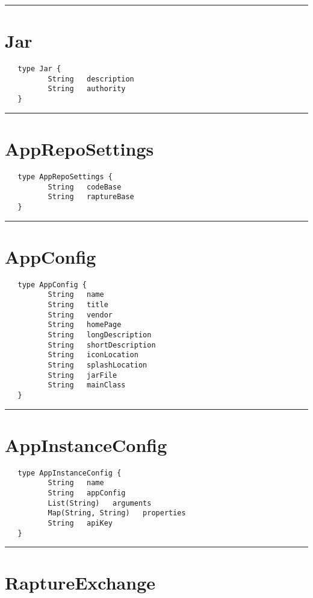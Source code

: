 \rule{12cm}{2pt}
\section{Jar}
\label{type:Jar}

\begin{Verbatim}
   type Jar {
          String   description
          String   authority
   }
\end{Verbatim}

\rule{12cm}{2pt}
\section{AppRepoSettings}
\label{type:AppRepoSettings}

\begin{Verbatim}
   type AppRepoSettings {
          String   codeBase
          String   raptureBase
   }
\end{Verbatim}

\rule{12cm}{2pt}
\section{AppConfig}
\label{type:AppConfig}

\begin{Verbatim}
   type AppConfig {
          String   name
          String   title
          String   vendor
          String   homePage
          String   longDescription
          String   shortDescription
          String   iconLocation
          String   splashLocation
          String   jarFile
          String   mainClass
   }
\end{Verbatim}

\rule{12cm}{2pt}
\section{AppInstanceConfig}
\label{type:AppInstanceConfig}

\begin{Verbatim}
   type AppInstanceConfig {
          String   name
          String   appConfig
          List(String)   arguments
          Map(String, String)   properties
          String   apiKey
   }
\end{Verbatim}

\rule{12cm}{2pt}
\section{RaptureExchange}
\label{type:RaptureExchange}

